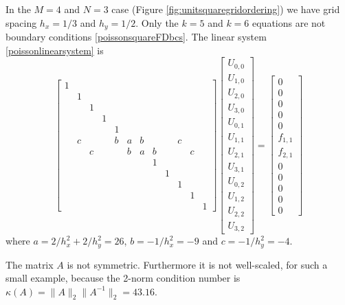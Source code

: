 \medskip\noindent\hrulefill
\begin{example} In the $M=4$ and $N=3$ case (Figure \ref{fig:unitsquaregridordering}) we have grid spacing $h_x=1/3$ and $h_y=1/2$.  Only the $k=5$ and $k=6$ equations are not boundary conditions \eqref{poissonsquareFDbcs}.  The linear system \eqref{poissonlinearsystem} is
\setcounter{MaxMatrixCols}{20}
\begin{equation*}
\begin{bmatrix}
1 &  &  &  &  &  &  &  &  &  &  &  \\
  & 1&  &  &  &  &  &  &  &  &  &  \\
  &  & 1&  &  &  &  &  &  &  &  &  \\
  &  &  & 1&  &  &  &  &  &  &  &  \\
  &  &  &  & 1&  &  &  &  &  &  &  \\
  & c&  &  & b& a& b&  &  & c&  &  \\
  &  & c&  &  & b& a& b&  &  & c&  \\
  &  &  &  &  &  &  & 1&  &  &  &  \\
  &  &  &  &  &  &  &  & 1&  &  &  \\
  &  &  &  &  &  &  &  &  & 1&  &  \\
  &  &  &  &  &  &  &  &  &  & 1&  \\
  &  &  &  &  &  &  &  &  &  &  & 1
\end{bmatrix}
\begin{bmatrix}
U_{0,0} \\
U_{1,0} \\
U_{2,0} \\
U_{3,0} \\
U_{0,1} \\
U_{1,1} \\
U_{2,1} \\
U_{3,1} \\
U_{0,2} \\
U_{1,2} \\
U_{2,2} \\
U_{3,2}
\end{bmatrix}
=
\begin{bmatrix}
0 \\
0 \\
0 \\
0 \\
0 \\
f_{1,1} \\
f_{2,1} \\
0 \\
0 \\
0 \\
0 \\
0
\end{bmatrix}
\end{equation*}
where $a = 2/h_x^2 + 2/h_y^2 = 26$, $b = - 1/h_x^2 = -9$ and $c = - 1/h_y^2 = -4$.

The matrix $A$ is not symmetric.  Furthermore it is not well-scaled, for such a small example, because the 2-norm condition number is $\kappa(A) = \|A\|_2 \|A^{-1}\|_2 = 43.16$.

\noindent\hrulefill
\end{example}

